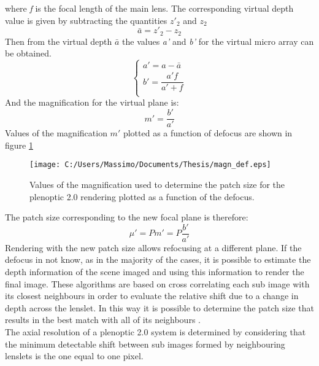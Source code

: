 where \textit{f} is the focal length of the main lens. The corresponding virtual depth value is given by subtracting the quantities $z'_2$ and $z_2$
\begin{equation}
\label{eq:def202}
\bar{a} = z'_2-z_2
\end{equation}
Then from the virtual depth $\bar{a}$ the values \textit{a'} and \textit{b'} for the virtual micro array can be obtained.
\begin{equation}
\begin{cases}
a' = a-\bar{a}   \\
b' = \dfrac{a'f}{a'+f} \\
\end{cases}
\end{equation}
And the magnification for the virtual plane is:
\begin{equation}
\label{eq:def204}
m' = \dfrac{b'}{a'}
\end{equation}
Values of the magnification $m'$ plotted as a function of defocus are shown in figure \ref{fig:def202}
\begin{figure}[H]
	\centering
	\texttt{[image: C:/Users/Massimo/Documents/Thesis/magn\_def.eps]}
	\caption{\label{fig:def202} Values of the magnification used to determine the patch size for the plenoptic 2.0 rendering plotted as a function of the defocus.  }
\end{figure}
The patch size corresponding to the new focal plane is therefore:
\begin{equation}
	\label{eq:patch2}
	\mu' = Pm' = P\dfrac{b'}{a'}
\end{equation}
Rendering with the new patch size allows refocusing at a different plane. If the defocus in not know, as in the majority of the cases, it is possible to estimate the depth information of the scene imaged and using this information to render the final image. These algorithms are based on cross correlating each sub image with its closest neighbours in order to evaluate the relative shift due to a change in depth across the lenslet\cite{hansen2011depth,johannsen2013calibration}. In this way it is possible to determine the patch size that results in the best match with all of its neighbours \cite{georgiev2010focused,lumsdaine2008full}.  \\
The axial resolution of a plenoptic 2.0 system is determined by considering that the minimum detectable shift between sub images formed by neighbouring lenslets is the one equal to one pixel. 
